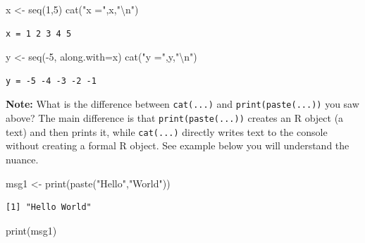 \documentclass[
  letterpaper,
]{book}
\newenvironment{Shaded}{\begin{snugshade}}{\end{snugshade}}
\newcommand{\AttributeTok}[1]{\textcolor[rgb]{0.40,0.45,0.13}{#1}}
\newcommand{\DecValTok}[1]{\textcolor[rgb]{0.68,0.00,0.00}{#1}}
\newcommand{\FunctionTok}[1]{\textcolor[rgb]{0.28,0.35,0.67}{#1}}
\newcommand{\NormalTok}[1]{\textcolor[rgb]{0.00,0.23,0.31}{#1}}
\newcommand{\OtherTok}[1]{\textcolor[rgb]{0.00,0.23,0.31}{#1}}
\newcommand{\SpecialCharTok}[1]{\textcolor[rgb]{0.37,0.37,0.37}{#1}}
\newcommand{\StringTok}[1]{\textcolor[rgb]{0.13,0.47,0.30}{#1}}
\begin{document}
\begin{Shaded}
\begin{Highlighting}[]
\NormalTok{x }\OtherTok{\textless{}{-}} \FunctionTok{seq}\NormalTok{(}\DecValTok{1}\NormalTok{,}\DecValTok{5}\NormalTok{)}
\FunctionTok{cat}\NormalTok{(}\StringTok{"x ="}\NormalTok{,x,}\StringTok{"}\SpecialCharTok{\textbackslash{}n}\StringTok{"}\NormalTok{)}
\end{Highlighting}
\end{Shaded}

\begin{verbatim}
x = 1 2 3 4 5 
\end{verbatim}

\begin{Shaded}
\begin{Highlighting}[]
\NormalTok{y }\OtherTok{\textless{}{-}} \FunctionTok{seq}\NormalTok{(}\SpecialCharTok{{-}}\DecValTok{5}\NormalTok{, }\AttributeTok{along.with=}\NormalTok{x)}
\FunctionTok{cat}\NormalTok{(}\StringTok{"y ="}\NormalTok{,y,}\StringTok{"}\SpecialCharTok{\textbackslash{}n}\StringTok{"}\NormalTok{)}
\end{Highlighting}
\end{Shaded}

\begin{verbatim}
y = -5 -4 -3 -2 -1 
\end{verbatim}

\textbf{Note:} What is the difference between \texttt{cat(...)} and
\texttt{print(paste(...))} you saw above? The main difference is that
\texttt{print(paste(...))} creates an R object (a text) and then prints
it, while \texttt{cat(...)} directly writes text to the console without
creating a formal R object. See example below you will understand the
nuance.

\begin{Shaded}
\begin{Highlighting}[]
\NormalTok{msg1 }\OtherTok{\textless{}{-}} \FunctionTok{print}\NormalTok{(}\FunctionTok{paste}\NormalTok{(}\StringTok{"Hello"}\NormalTok{,}\StringTok{"World"}\NormalTok{))}
\end{Highlighting}
\end{Shaded}

\begin{verbatim}
[1] "Hello World"
\end{verbatim}

\begin{Shaded}
\begin{Highlighting}[]
\FunctionTok{print}\NormalTok{(msg1)}
\end{Highlighting}
\end{Shaded}
\end{document}
